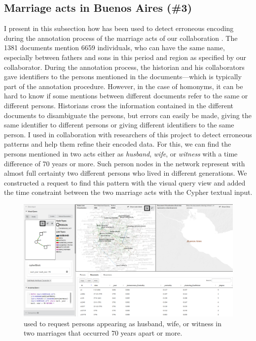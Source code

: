 \subsection{Marriage acts in Buenos Aires (\#3)}\label{subsec:usecase-BA}
I present in this subsection how \combinet has been used to detect erroneous encoding during the annotation process of the marriage acts of our collaboration \zacarias.
The 1381 documents mention 6659 individuals, who can have the same name, especially between fathers and sons in this period and region as specified by our collaborator.
During the annotation process, the historian and his collaborators gave identifiers to the persons mentioned in the documents---which is typically part of the annotation procedure.
However, in the case of homonyms, it can be hard to know if some mentions between different documents refer to the same or different persons.
Historians cross the information contained in the different documents to disambiguate the persons\cite{winchesterLinkageHistoricalRecords1970}, but errors can easily be made, \ie giving the same identifier to different persons or giving different identifiers to the same person.
I used \combinet in collaboration with researchers of this project to detect erroneous patterns and help them refine their encoded data.
For this, we can find the persons mentioned in two acts either as \textit{husband}, \textit{wife}, or \textit{witness} with a time difference of 70 years or more.
Such person nodes in the network represent with almost full certainty two different persons who lived in different generations.
We constructed a request to find this pattern with the visual query view and added the time constraint between the two marriage acts with the Cypher textual input.
\begin{figure}[!ht]
    \centering
    \includegraphics[width=\linewidth]{static/figures/ComBiNet/BuenosAires_correction}
    \caption{\name used to request persons appearing as husband, wife, or witness in two marriages that occurred 70 years apart or more.}\label{fig:combinet-BuenosAires-correction}
\end{figure}

